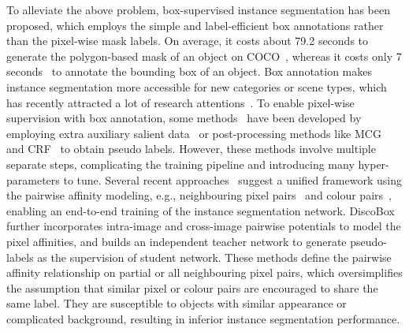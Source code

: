 \documentclass[12pt,onecolumn,letterpaper]{article}
\begin{document}
To alleviate the above problem, box-supervised instance segmentation has been proposed, which employs the simple and label-efficient box annotations rather than the pixel-wise mask labels. On average, it costs about 79.2 seconds to generate the polygon-based mask of an object on COCO~\cite{lin2014microsoft}, whereas it costs only 7 seconds~\cite{papadopoulos2017extreme} to annotate the bounding box of an object. 
Box annotation makes instance segmentation more accessible for new categories or scene types, which has recently attracted a lot of research attentions~\cite{eccv2020box2seg,nips2019-bbtp,cvpr2021_boxinst,cvpr2021bbam,cvpr2021boxcaseg,iccv2021discobox}. To enable pixel-wise supervision with box annotation, some methods~\cite{cvpr2021bbam,cvpr2021boxcaseg} have been developed by employing extra auxiliary salient data~\cite{cvpr2021boxcaseg} or post-processing methods like MCG~\cite{tpmai2017mcg} and CRF~\cite{krahenbuhl2011efficient} to obtain pseudo labels. However, these methods involve multiple separate steps, complicating the training pipeline and introducing many hyper-parameters to tune.
Several recent approaches~\cite{nips2019-bbtp,cvpr2021_boxinst} suggest a unified framework using the pairwise affinity modeling, e.g., neighbouring pixel pairs~\cite{nips2019-bbtp} and colour pairs~\cite{cvpr2021_boxinst}, enabling an end-to-end training of the instance segmentation network.
DiscoBox~\cite{iccv2021discobox} further incorporates intra-image and cross-image pairwise potentials to model the pixel affinities, and builds an independent teacher network to generate pseudo-labels as the supervision of student network. 
These methods define the pairwise affinity relationship on partial or all neighbouring pixel pairs, which oversimplifies the assumption that similar pixel or colour pairs are encouraged to share the same label. They are susceptible to objects with similar appearance or complicated background, resulting in inferior instance segmentation performance.
\end{document}
